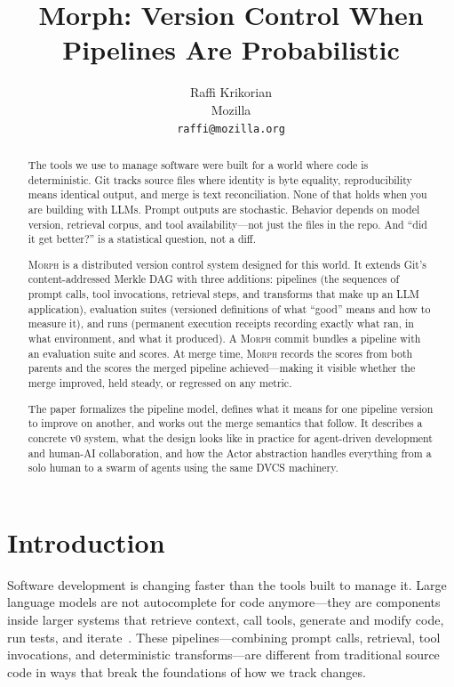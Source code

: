 \documentclass{article}
\title{\textbf{Morph: Version Control When Pipelines Are Probabilistic}}
\author{%
  Raffi Krikorian\\
  Mozilla\\
  \texttt{raffi@mozilla.org}
}
\date{}
\begin{document}
\maketitle

\begin{abstract}
The tools we use to manage software were built for a world where code is
deterministic. Git tracks source files where identity is byte equality,
reproducibility means identical output, and merge is text reconciliation. None
of that holds when you are building with LLMs. Prompt outputs are stochastic.
Behavior depends on model version, retrieval corpus, and tool availability---not
just the files in the repo. And ``did it get better?'' is a statistical
question, not a diff.

\textsc{Morph} is a distributed version control system designed for this world.
It extends Git's content-addressed Merkle DAG with three additions:
pipelines (the sequences of prompt calls, tool invocations, retrieval steps,
and transforms that make up an LLM application), evaluation suites (versioned
definitions of what ``good'' means and how to measure it), and runs (permanent
execution receipts recording exactly what ran, in what environment, and what
it produced). A \textsc{Morph} commit bundles a pipeline with an evaluation
suite and scores. At merge time, \textsc{Morph} records the scores from both
parents and the scores the merged pipeline achieved---making it visible whether
the merge improved, held steady, or regressed on any metric.

The paper formalizes the pipeline model, defines what it means for one pipeline
version to improve on another, and works out the merge semantics that follow.
It describes a concrete v0 system, what the design looks like in practice for
agent-driven development and human-AI collaboration, and how the Actor
abstraction handles everything from a solo human to a swarm of agents using
the same DVCS machinery.
\end{abstract}

\section{Introduction}
\label{sec:intro}

Software development is changing faster than the tools built to manage it.
Large language models are not autocomplete for code anymore---they are
components inside larger systems that retrieve context, call tools, generate
and modify code, run tests, and iterate~\citep{yao2023react,
jimenez2024swebench}. These pipelines---combining prompt calls, retrieval, tool
invocations, and deterministic transforms---are different from traditional source
code in ways that break the foundations of how we track changes.
\end{document}
